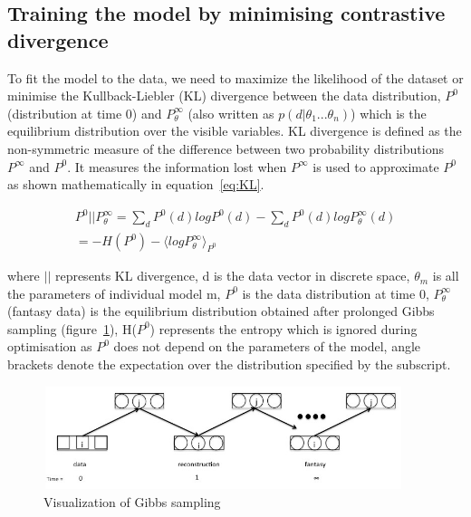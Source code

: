 \documentclass{acm_proc_article-sp}
\begin{document}
\subsection{Training the model by minimising contrastive divergence}
To fit the model to the data, we need to maximize the likelihood of the dataset or minimise the Kullback-Liebler (KL) divergence between the data distribution, $P^0$ (distribution at time 0) and $P^\infty_\theta$ (also written as $p(d|\theta_{1}...\theta_{n})$) which is
the equilibrium distribution over the visible variables. KL divergence is defined as the non-symmetric measure of the difference between two probability distributions $P^\infty$ and $P^0$. It measures the information lost when $P^\infty$ is used to approximate $P^{0}$ as shown mathematically in equation~\ref{eq:KL}.

\begin{eqnarray}
P^0 || P^\infty_\theta =  \sum_{d}P^0 (d)logP^0(d) - \sum_{d}P^0 (d)logP^\infty_\theta(d)  \label{eq:KL} \\
 = \nonumber -H(P^0) - \langle log P^\infty_\theta \rangle_{P^{0}}
\end{eqnarray}

where $||$ represents KL divergence, d is the data vector in discrete space, $\theta_m$ is all the parameters of individual model m, $P^0$ is the data distribution at time $0$, $P^\infty_\theta$ (fantasy data) is the equilibrium distribution obtained after prolonged Gibbs sampling (figure~\ref{fig:gibbs}), H($P^0$) represents the entropy which is ignored during optimisation as $P^0$ does not depend on the parameters of the model, angle brackets denote the expectation over the distribution specified by the subscript. \\

 \begin{figure}[t]
\centering
\includegraphics[width=10.5cm,height=3cm]{gibbs.jpg}
\caption{Visualization of Gibbs sampling}
\label{fig:gibbs}
\end{figure}
\end{document}
